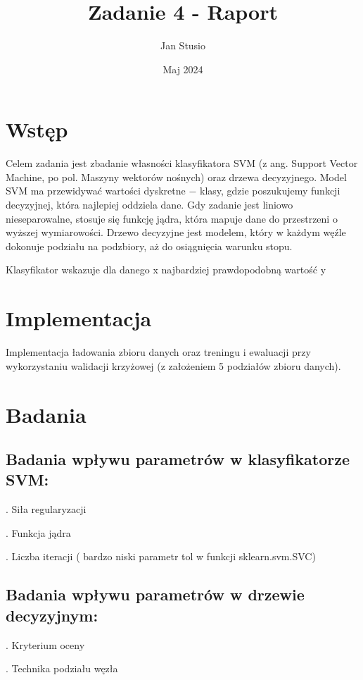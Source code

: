 \documentclass{article}
\title{Zadanie 4 - Raport}
\author{Jan Stusio}
\date{Maj 2024}
\begin{document}
\maketitle

\section{Wstęp}

Celem zadania jest zbadanie własności klasyfikatora SVM (z ang. Support Vector Machine, po pol. Maszyny wektorów nośnych) oraz drzewa decyzyjnego.
Model SVM ma przewidywać wartości dyskretne $-$ klasy, gdzie poszukujemy funkcji decyzyjnej, która najlepiej oddziela dane.
Gdy zadanie jest liniowo nieseparowalne, stosuje się funkcję jądra, która mapuje dane do przestrzeni o wyższej wymiarowości. 
Drzewo decyzyjne jest modelem, który w każdym węźle dokonuje podziału na podzbiory, aż do osiągnięcia warunku stopu.


Klasyfikator wskazuje dla danego x najbardziej prawdopodobną wartość y

\section{Implementacja}

Implementacja ładowania zbioru danych oraz treningu i ewaluacji przy wykorzystaniu walidacji krzyżowej (z założeniem 5 podziałów zbioru danych).

\section{Badania}

\subsection{Badania wpływu parametrów w klasyfikatorze SVM\@:}

. Siła regularyzacji

. Funkcja jądra

. Liczba iteracji ( bardzo niski parametr tol w funkcji sklearn.svm.SVC)

\subsection{Badania wpływu parametrów w drzewie decyzyjnym\@:}

. Kryterium oceny

. Technika podziału węzła
\end{document}
